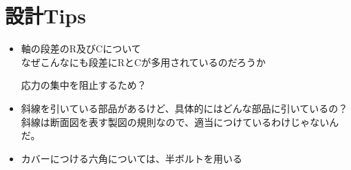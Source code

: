\chapter{設計Tips}
\begin{itemize}
\item 軸の段差のR及びCについて\\
なぜこんなにも段差にRとCが多用されているのだろうか\\
\par
応力の集中を阻止するため？
\item 斜線を引いている部品があるけど、具体的にはどんな部品に引いているの？\\
斜線は断面図を表す製図の規則なので、適当につけているわけじゃないんだ。
\item カバーにつける六角については、半ボルトを用いる

\end{itemize}
